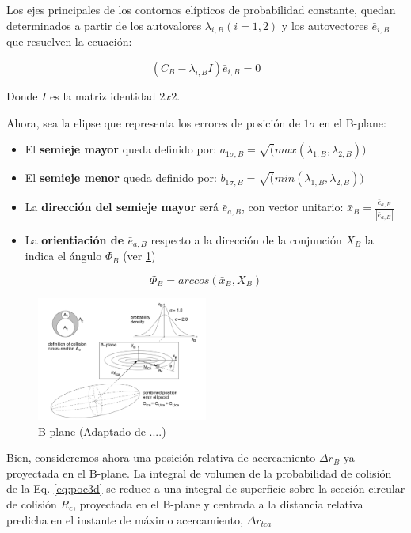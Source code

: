 Los ejes principales de los contornos el\'ipticos de probabilidad constante, quedan determinados a partir de los autovalores $\lambda_{i,B}(i=1,2)$ y los autovectores $\bar{e}_{i,B}$ que resuelven la ecuaci\'on:

\begin{equation}
(C_{B} - \lambda_{i,B} I) \bar{e}_{i,B} = \bar{0}
\end{equation}

Donde $I$ es la matriz identidad $2x2$.

Ahora, sea la elipse que representa los errores de posici\'on de $1\sigma$ en el B-plane:\\

\begin{itemize}
 \item El {\bf{semieje mayor}} queda definido por: $a_{1\sigma,B}=\sqrt(max(\lambda_{1,B},\lambda_{2,B}))$
 \item El {\bf{semieje menor}} queda definido por: $b_{1\sigma,B}=\sqrt(min(\lambda_{1,B},\lambda_{2,B}))$
 \item La {\bf{direcci\'on del semieje mayor}} ser\'a $\bar{e}_{a,B}$, con vector unitario: $ \bar{x}_{B}=\frac{\bar{e}_{a,B}}{|\bar{e}_{a,B}|}$ 
 \item La {\bf{orientiaci\'on de $\bar{e}_{a,B}$}} respecto a la direcci\'on de la conjunci\'on $X_{B}$ la indica el \'angulo $\Phi_{B}$ (ver \ref{fig:bplane})
\end{itemize}

\begin{equation}
 \Phi_{B}= arccos(\bar{x}_{B},X_{B})
\end{equation}

\begin{figure}[!h]
\centering
 \includegraphics[width=0.5\textwidth]{imagenes/Bplane}
 \caption{ B-plane (Adaptado de ....)}
 \label{fig:bplane}
\end{figure}

Bien, consideremos ahora una posici\'on relativa de acercamiento $\Delta r_{B}$ ya proyectada en el B-plane. La integral de volumen de la probabilidad de colisi\'on de la Eq. \ref{eq:poc3d} se reduce a una integral de superficie sobre la secci\'on circular de colisi\'on $R_{c}$, proyectada en el B-plane y centrada a la distancia relativa predicha en el instante de m\'aximo acercamiento, $\Delta r_{tca}$

